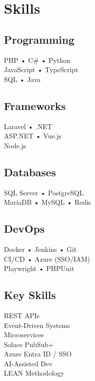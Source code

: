 \documentclass[]{styling}
\begin{document}
\noindent
\begin{minipage}[t]{0.27\textwidth}
\vspace{10pt}


\section{Skills}

\subsection{Programming}
PHP • C\# • Python \\
JavaScript • TypeScript \\
SQL • Java
\sectionsep

\subsection{Frameworks}
Laravel • .NET \\
ASP.NET • Vue.js \\
Node.js
\sectionsep

\subsection{Databases}
SQL Server • PostgreSQL \\
MariaDB • MySQL • Redis
\sectionsep

\subsection{DevOps}
Docker • Jenkins • Git \\
CI/CD • Azure (SSO/IAM) \\
Playwright • PHPUnit
\sectionsep

\subsection{Key Skills}
REST APIs \\
Event-Driven Systems \\
Microservices \\
Solace PubSub+ \\
Azure Entra ID / SSO \\
AI-Assisted Dev \\
LEAN Methodology
\sectionsep


\end{minipage}
\end{document}
